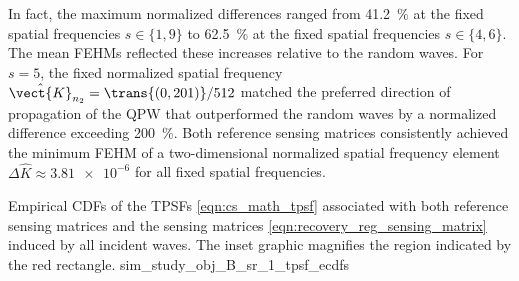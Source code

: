 In fact,
the maximum normalized differences ranged from
\SI{41.2}{\percent} at
the fixed spatial frequencies
$s \in \{ 1, 9 \}$ to
\SI{62.5}{\percent} at
the fixed spatial frequencies
$s \in \{ 4, 6 \}$.
The mean \acp{FEHM} reflected
these increases relative to
the random waves.
For $s = 5$,
the fixed normalized spatial frequency
$\hat{\vect{K}}_{ n_{2} } = \trans{ ( 0, 201 ) } / 512$ matched
the preferred direction of
propagation of
the \ac{QPW} that outperformed
the random waves by
a normalized difference exceeding
\SI{200}{\percent}.
Both reference sensing matrices consistently achieved
the minimum \ac{FEHM} of
a two-dimensional normalized spatial frequency element
$\Delta \hat{K} \approx \num{3.81e-6}$ for
all fixed spatial frequencies.


%
{%
 Empirical \acfp{CDF} of
 the \aclp{TPSF}
 \eqref{eqn:cs_math_tpsf} associated with
 both reference sensing matrices and
 the sensing matrices
 \eqref{eqn:recovery_reg_sensing_matrix} induced by
 all incident waves.
 The inset graphic magnifies
 the region indicated by
 the red rectangle.
}%
{sim_study_obj_B_sr_1_tpsf_ecdfs}

